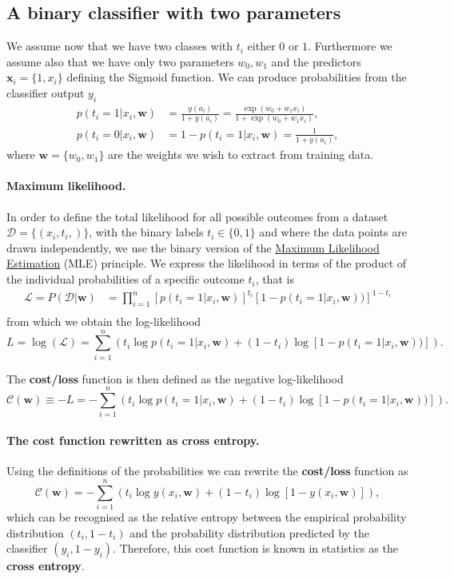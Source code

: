 \documentclass[%
oneside,                 %
final,                   %
10pt]{article}
\begin{document}
\subsection{A binary classifier with two parameters}

We assume now that we have two classes with $t_i$ either $0$ or $1$. Furthermore we assume also that we have only two parameters $w_0, w_1$ and the predictors $\boldsymbol{x}_i = \{ 1, x_i \}$ defining the Sigmoid function. We can produce probabilities from the classifier output $y_i$
\begin{align*}
p(t_i=1|x_i,\boldsymbol{w}) &= \frac{y(a_i)}{1 + y(a_i)} = \frac{\exp{(w_0+w_1x_i)}}{1+\exp{(w_0+w_1x_i)}},\nonumber\\
p(t_i=0|x_i,\boldsymbol{w}) &= 1 - p(t_i=1|x_i,\boldsymbol{w}) = \frac{1}{1 + y(a_i)} ,
\end{align*}
where $\boldsymbol{w} = \{ w_0, w_1\}$ are the weights we wish to extract from training data. 

\paragraph{Maximum likelihood.}
In order to define the total likelihood for all possible outcomes from a  
dataset $\mathcal{D}=\{(x_i, t_i,)\}$, with the binary labels
$t_i\in\{0,1\}$ and where the data points are drawn independently, we use the binary version of the \href{{https://en.wikipedia.org/wiki/Maximum_likelihood_estimation}}{Maximum Likelihood Estimation} (MLE) principle. 
We express the 
likelihood in terms of the product of the individual probabilities of a specific outcome $t_i$, that is 
\begin{align*}
\mathcal{L} = P(\mathcal{D}|\boldsymbol{w})& = \prod_{i=1}^n \left[p(t_i=1|x_i,\boldsymbol{w})\right]^{t_i}\left[1-p(t_i=1|x_i,\boldsymbol{w}))\right]^{1-t_i}\nonumber \\
\end{align*}
from which we obtain the log-likelihood 
\[
L = \log(\mathcal{L}) = \sum_{i=1}^n \left( t_i\log{p(t_i=1|x_i,\boldsymbol{w})} + (1-t_i)\log\left[1-p(t_i=1|x_i,\boldsymbol{w}))\right]\right).
\]

The \textbf{cost/loss} function is then defined as the negative log-likelihood
\[
\mathcal{C}(\boldsymbol{w}) \equiv -L = -\sum_{i=1}^n \left( t_i\log{p(t_i=1|x_i,\boldsymbol{w})} + (1-t_i)\log\left[1-p(t_i=1|x_i,\boldsymbol{w}))\right]\right).
\]

\paragraph{The cost function rewritten as cross entropy.}
Using the definitions of the probabilities we can rewrite the \textbf{cost/loss} function as
\[
\mathcal{C}(\boldsymbol{w}) = -\sum_{i=1}^n \left( t_i\log{ y(x_i,\boldsymbol{w})} + (1-t_i)\log\left[ 1-y( x_i,\boldsymbol{w}) \right] \right),
\]
which can be recognised as the relative entropy between the empirical probability distribution $(t_i, 1-t_i)$ and the probability distribution predicted by the classifier $(y_i, 1-y_i)$.
Therefore, this cost function is known in statistics as the \textbf{cross entropy}. 
\end{document}
